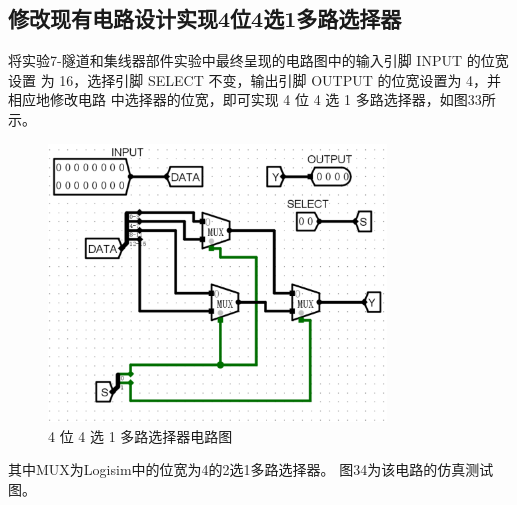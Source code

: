 \documentclass{article}
\begin{document}
    \subsection{修改现有电路设计实现4位4选1多路选择器}

    将实验7-隧道和集线器部件实验中最终呈现的电路图中的输入引脚 INPUT 的位宽设置
    为 16，选择引脚 SELECT 不变，输出引脚 OUTPUT 的位宽设置为 4，并相应地修改电路
    中选择器的位宽，即可实现 4 位 4 选 1 多路选择器，如图33所示。
    \begin{figure}[H]
    \centering
    \includegraphics[width=0.8\textwidth]{9.1.png}
    \caption{4 位 4 选 1 多路选择器电路图}
    \end{figure}
    其中MUX为Logisim中的位宽为4的2选1多路选择器。
    图34为该电路的仿真测试图。
\end{document}
